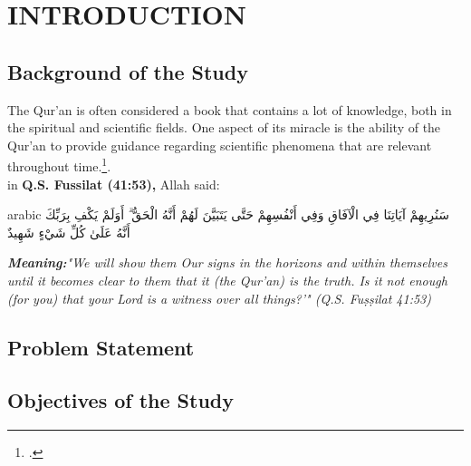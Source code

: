 \chapter{INTRODUCTION}
	\section{Background of the Study}
	\setlength{\leftskip}{0.7cm}
	The Qur'an is often considered a book that contains a lot of knowledge, both in the spiritual and scientific fields. One aspect of its miracle is the ability of the Qur'an to provide guidance regarding scientific phenomena that are relevant throughout time.\footcite{bakir2016}.\\
	in \textbf{Q.S. Fussilat (41:53),} Allah said:\\	%
	
\begin{otherlanguage*}{arabic}
	\noindent
سَنُرِيهِمْ آيَاتِنَا فِي الْآفَاقِ وَفِي أَنْفُسِهِمْ حَتَّى يَتَبَيَّنَ لَهُمْ أَنَّهُ الْحَقُّ ۗ أَوَلَمْ يَكْفِ بِرَبِّكَ أَنَّهُ عَلَىٰ كُلِّ شَيْءٍ شَهِيدٌ
\end{otherlanguage*}
	\vspace{0.5cm}

	\textit{\textbf{Meaning:}"We will show them Our signs in the horizons and within themselves until it becomes clear to them that it (the Qur'an) is the truth. Is it not enough (for you) that your Lord is a witness over all things?'" (Q.S. Fuṣṣilat 41:53)}\\
	
	\section{Problem Statement}
	\lipsum
	
	\section{Objectives of the Study}
	\lipsum
	
